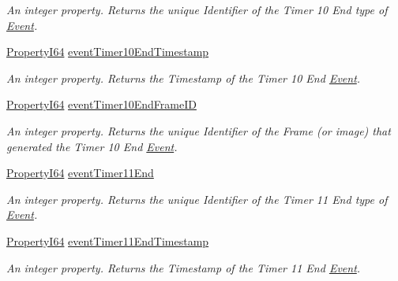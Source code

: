 \begin{DoxyCompactItemize}
\begin{DoxyCompactList}\small\item\em An integer property. Returns the unique Identifier of the Timer 10 End type of \hyperlink{classmv_i_m_p_a_c_t_1_1acquire_1_1_event}{Event}. \end{DoxyCompactList}\item 
\hyperlink{group___common_interface_ga81749b2696755513663492664a18a893}{Property\+I64} \hyperlink{classmv_i_m_p_a_c_t_1_1acquire_1_1_gen_i_cam_1_1_event_control_afc774fd94f55b5828fc6af849168d51e}{event\+Timer10\+End\+Timestamp}
\begin{DoxyCompactList}\small\item\em An integer property. Returns the Timestamp of the Timer 10 End \hyperlink{classmv_i_m_p_a_c_t_1_1acquire_1_1_event}{Event}. \end{DoxyCompactList}\item 
\hyperlink{group___common_interface_ga81749b2696755513663492664a18a893}{Property\+I64} \hyperlink{classmv_i_m_p_a_c_t_1_1acquire_1_1_gen_i_cam_1_1_event_control_a18ec12b028fb9e5f7ec2505d1ee53ea8}{event\+Timer10\+End\+Frame\+I\+D}
\begin{DoxyCompactList}\small\item\em An integer property. Returns the unique Identifier of the Frame (or image) that generated the Timer 10 End \hyperlink{classmv_i_m_p_a_c_t_1_1acquire_1_1_event}{Event}. \end{DoxyCompactList}\item 
\hyperlink{group___common_interface_ga81749b2696755513663492664a18a893}{Property\+I64} \hyperlink{classmv_i_m_p_a_c_t_1_1acquire_1_1_gen_i_cam_1_1_event_control_adc93d20dfb2b18fdbe44ef115829fa71}{event\+Timer11\+End}
\begin{DoxyCompactList}\small\item\em An integer property. Returns the unique Identifier of the Timer 11 End type of \hyperlink{classmv_i_m_p_a_c_t_1_1acquire_1_1_event}{Event}. \end{DoxyCompactList}\item 
\hyperlink{group___common_interface_ga81749b2696755513663492664a18a893}{Property\+I64} \hyperlink{classmv_i_m_p_a_c_t_1_1acquire_1_1_gen_i_cam_1_1_event_control_adc13de766f617c535298458fb07ada82}{event\+Timer11\+End\+Timestamp}
\begin{DoxyCompactList}\small\item\em An integer property. Returns the Timestamp of the Timer 11 End \hyperlink{classmv_i_m_p_a_c_t_1_1acquire_1_1_event}{Event}. \end{DoxyCompactList}\item 

\end{DoxyCompactItemize}
